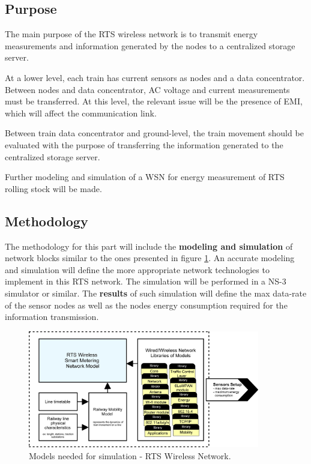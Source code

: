 \subsection{Purpose}

The main purpose of the \ac{RTS} wireless network is to transmit energy measurements and information generated by the nodes to a centralized storage server. 

At a lower level, each train has current sensors as nodes and a data concentrator. Between nodes and data concentrator, \ac{AC} voltage and current measurements must be transferred.
At this level, the relevant issue will be the presence of \ac{EMI}, which will affect the communication link.

Between train data concentrator and ground-level, the train movement should be evaluated with the purpose of transferring the information generated to the centralized storage server. 

Further modeling and simulation of a \ac{WSN} for energy measurement of \ac{RTS} rolling stock will be made.



\subsection{Methodology}

The methodology for this part will include the \textbf{modeling and simulation} of network blocks similar to the ones presented in figure \ref{fig:4.methodWireless}. An accurate modeling and simulation will define the more appropriate network technologies to implement in this \ac{RTS} network. 
The simulation will be performed in a NS-3 simulator or similar.
The \textbf{results} of such simulation will define the max data-rate of the sensor nodes as well as the nodes energy consumption required for the information transmission.

\begin{figure}[h!]
	\centering
	\includegraphics[width=0.9\textwidth,keepaspectratio]{figures/40.Method/methodWireless}
	\caption{Models needed for simulation - RTS Wireless Network.}
	\label{fig:4.methodWireless}
\end{figure}


